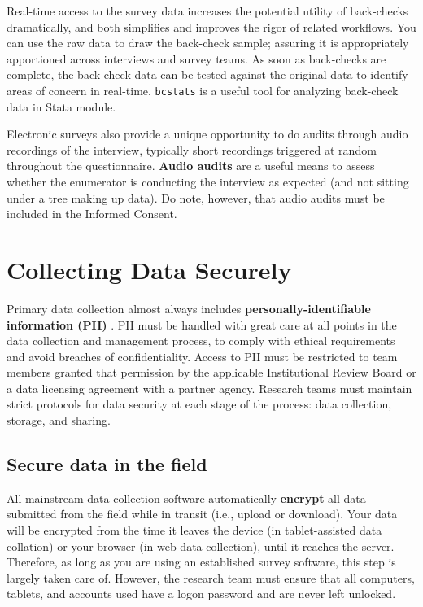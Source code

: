 Real-time access to the survey data increases the potential utility of 
back-checks dramatically, and both simplifies and improves the rigor of related 
workflows.
You can use the raw data to draw the back-check sample; assuring it is 
appropriately apportioned across interviews and survey teams.
As soon as back-checks are complete, the back-check data can be tested against 
the original data to identify areas of concern in real-time.
\texttt{bcstats} is a useful tool for analyzing back-check data in Stata module.

Electronic surveys also provide a unique opportunity to do audits through audio recordings of the interview, 
typically short recordings triggered at random throughout the questionnaire.
\textbf{Audio audits} are a useful means to assess whether the enumerator is conducting the interview 
as expected (and not sitting under a tree making up data).
Do note, however, that audio audits must be included in the Informed Consent.


\section{Collecting Data Securely}
Primary data collection almost always includes  \textbf{personally-identifiable information (PII)}
.
PII must be handled with great care at all points in the data collection and management process, to comply with ethical requirements and avoid breaches of confidentiality. Access to PII must be restricted to team members granted that permission by the applicable Institutional Review Board or a data licensing agreement with a partner agency. Research teams must maintain strict protocols for data security at each stage of the process: data collection, storage, and sharing.

\subsection{Secure data in the field}
All mainstream data collection software automatically \textbf{encrypt}
all data submitted from the field while in transit (i.e., upload or download).  Your data will be encrypted from the time it leaves the device (in tablet-assisted data collation) or your browser (in web data collection), until it reaches the server. Therefore, as long as you are using an established survey software, this step is largely taken care of. However, the research team must ensure that all computers, tablets, and accounts used have a logon password and are never left unlocked.

